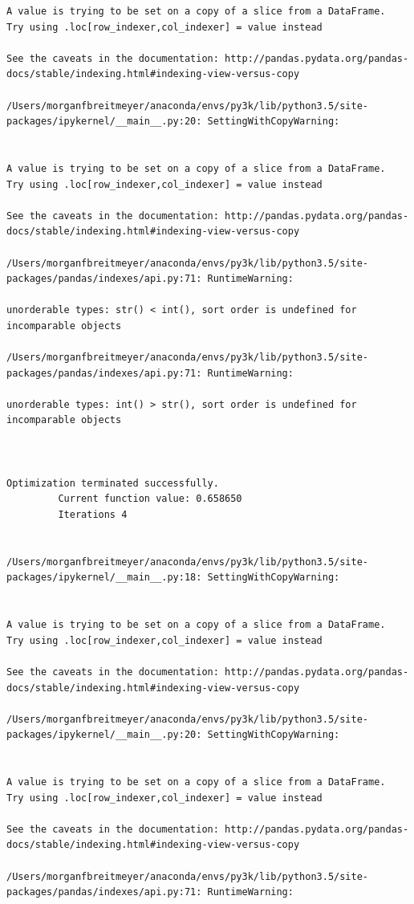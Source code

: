 \begin{lstlisting}
A value is trying to be set on a copy of a slice from a DataFrame.
Try using .loc[row_indexer,col_indexer] = value instead

See the caveats in the documentation: http://pandas.pydata.org/pandas-docs/stable/indexing.html#indexing-view-versus-copy

/Users/morganfbreitmeyer/anaconda/envs/py3k/lib/python3.5/site-packages/ipykernel/__main__.py:20: SettingWithCopyWarning:


A value is trying to be set on a copy of a slice from a DataFrame.
Try using .loc[row_indexer,col_indexer] = value instead

See the caveats in the documentation: http://pandas.pydata.org/pandas-docs/stable/indexing.html#indexing-view-versus-copy

/Users/morganfbreitmeyer/anaconda/envs/py3k/lib/python3.5/site-packages/pandas/indexes/api.py:71: RuntimeWarning:

unorderable types: str() < int(), sort order is undefined for incomparable objects

/Users/morganfbreitmeyer/anaconda/envs/py3k/lib/python3.5/site-packages/pandas/indexes/api.py:71: RuntimeWarning:

unorderable types: int() > str(), sort order is undefined for incomparable objects



Optimization terminated successfully.
         Current function value: 0.658650
         Iterations 4


/Users/morganfbreitmeyer/anaconda/envs/py3k/lib/python3.5/site-packages/ipykernel/__main__.py:18: SettingWithCopyWarning:


A value is trying to be set on a copy of a slice from a DataFrame.
Try using .loc[row_indexer,col_indexer] = value instead

See the caveats in the documentation: http://pandas.pydata.org/pandas-docs/stable/indexing.html#indexing-view-versus-copy

/Users/morganfbreitmeyer/anaconda/envs/py3k/lib/python3.5/site-packages/ipykernel/__main__.py:20: SettingWithCopyWarning:


A value is trying to be set on a copy of a slice from a DataFrame.
Try using .loc[row_indexer,col_indexer] = value instead

See the caveats in the documentation: http://pandas.pydata.org/pandas-docs/stable/indexing.html#indexing-view-versus-copy

/Users/morganfbreitmeyer/anaconda/envs/py3k/lib/python3.5/site-packages/pandas/indexes/api.py:71: RuntimeWarning:


\end{lstlisting}
